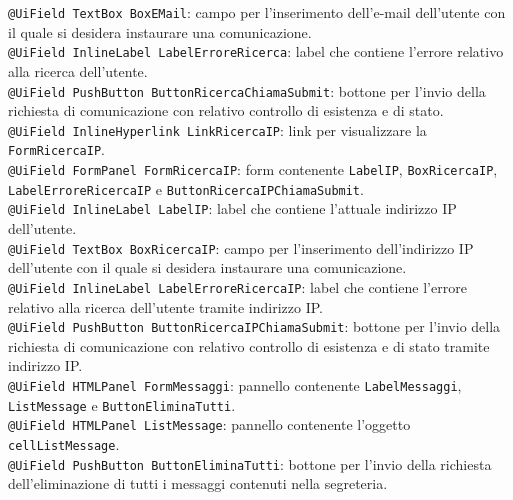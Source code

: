 {\begin{sloppypar}
{{\begin{itemize}
					\texttt{@UiField TextBox BoxEMail}: campo per l'inserimento dell'e-mail dell'utente 
						con il quale si desidera instaurare una comunicazione.\\

					\texttt{@UiField InlineLabel LabelErroreRicerca}: label che contiene l'errore relativo 
						alla ricerca dell'utente.\\

					\texttt{@UiField PushButton ButtonRicercaChiamaSubmit}: bottone per l'invio della 
						richiesta di comunicazione con relativo controllo di esistenza e di stato.\\

					\texttt{@UiField InlineHyperlink LinkRicercaIP}:  link per visualizzare la 
						\texttt{FormRicercaIP}.\\

					\texttt{@UiField FormPanel FormRicercaIP}: form contenente \texttt{LabelIP}, \texttt{BoxRicercaIP}, 
						\texttt{LabelErroreRicercaIP} e \texttt{ButtonRicercaIPChiamaSubmit}.\\

					\texttt{@UiField InlineLabel LabelIP}: label che contiene l'attuale indirizzo IP\g~ dell'utente.\\
						
					\texttt{@UiField TextBox BoxRicercaIP}: campo per l'inserimento dell'indirizzo IP\g~ 
						dell'utente con il quale si desidera instaurare una comunicazione.\\

					\texttt{@UiField InlineLabel LabelErroreRicercaIP}: label che contiene l'errore 
						relativo alla ricerca dell'utente tramite indirizzo IP\g .\\

					\texttt{@UiField PushButton ButtonRicercaIPChiamaSubmit}: bottone per l'invio della 
						richiesta di comunicazione con relativo controllo di esistenza e di stato tramite indirizzo IP\g .\\

					\texttt{@UiField HTMLPanel FormMessaggi}: pannello contenente \texttt{LabelMessaggi}, \texttt{ListMessage} e \texttt{ButtonEliminaTutti}.\\
					
					\texttt{@UiField HTMLPanel ListMessage}: pannello contenente l'oggetto \texttt{cellListMessage}.\\
					
					\texttt{@UiField PushButton ButtonEliminaTutti}: bottone per l'invio della richiesta dell'eliminazione di tutti i messaggi contenuti nella segreteria.\\
					

\end{itemize}}}
\end{sloppypar}}
